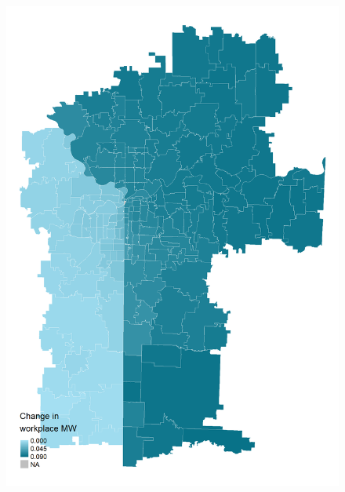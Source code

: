 \documentclass[aspectratio=169, t]{beamer}
\begin{document}
\begin{frame}[label = kc_example]
\begin{columns}
\begin{column}{0.50\textwidth}
\begin{figure}
                \includegraphics[scale = 0.3]{maps_events/output/kc2018-12_wkp_mw.png}
            \end{figure}   
        \end{column}
    \end{columns}
     \hyperlink{chi_example}{}
\end{frame}
\end{document}

